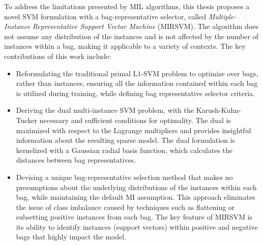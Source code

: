 \documentclass[reqno]{vcuthesis}
\newcommand{\iitem}{\item[-]}
\numberwithin{equation}{chapter}
\begin{document}
To address the limitations presented by MIL algorithms, this thesis proposes a novel SVM formulation with a bag-representative selector, called \textit{Multiple-Instance Representative Support Vector Machine} (MIRSVM). The algorithm does not assume any distribution of the instances and is not affected by the number of instances within a bag, making it applicable to a variety of contexts. The key contributions of this work include:
\begin{itemize}
\iitem Reformulating the traditional primal L$1$-SVM problem to optimize over bags, rather than instances, ensuring all the information contained within each bag is utilized during training, while defining bag representative selector criteria.

\iitem Deriving the dual multi-instance SVM problem, with the Karush-Kuhn-Tucker necessary and sufficient conditions for optimality. The dual is maximized with respect to the Lagrange multipliers and provides insightful information about the resulting sparse model. The dual formulation is kernelized with a Gaussian radial basis function, which calculates the distances between bag representatives.

\iitem Devising a unique bag-representative selection method that makes no presumptions about the underlying distributions of the instances within each bag, while maintaining the default MI assumption. This approach eliminates the issue of class imbalance caused by techniques such as flattening or subsetting positive instances from each bag. The key feature of MIRSVM is its ability to identify instances (support vectors) within positive and negative bags that highly impact the model.
\end{itemize}
\end{document}
